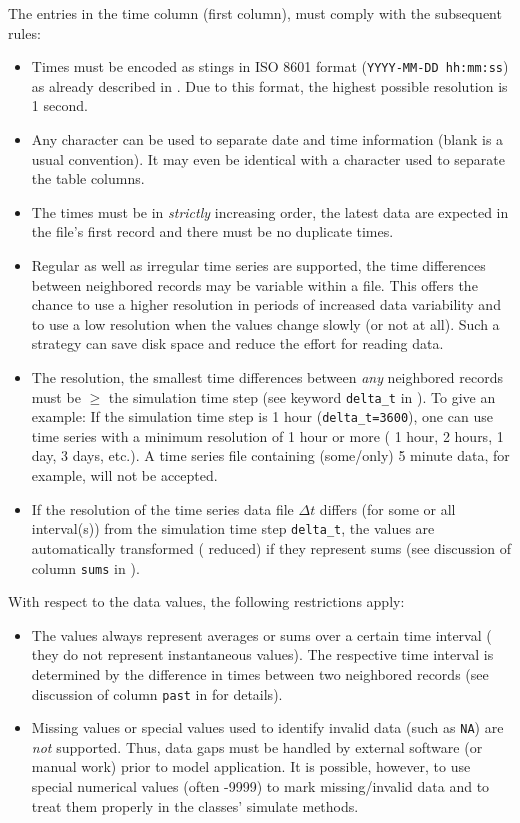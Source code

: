 The entries in the time column (first column), must comply with the subsequent rules:
\begin{itemize}
  \item Times must be encoded as stings in ISO 8601 format (\verb!YYYY-MM-DD hh:mm:ss!) as already described in . Due to this format, the highest possible resolution is 1 second.
  \item Any character can be used to separate date and time information (blank is a usual convention). It may even be identical with a character used to separate the table columns.
  \item The times must be in \emph{strictly} increasing order, \ie{} the latest data are expected in the file's first record and there must be no duplicate times.
  \item Regular as well as irregular time series are supported, \ie{} the time differences between neighbored records may be variable within a file. This offers the chance to use a higher resolution in periods of increased data variability and to use a low resolution when the values change slowly (or not at all). Such a strategy can save disk space and reduce the effort for reading data.
  \item The resolution, \ie{} the smallest time differences between \emph{any} neighbored records must be $\geq$ the simulation time step (see keyword \verb!delta_t! in ). To give an example: If the simulation time step is 1 hour (\verb!delta_t=3600!), one can use time series with a minimum resolution of 1 hour or more (\ie{} 1 hour, 2 hours, 1 day, 3 days, etc.). A time series file containing (some/only) 5 minute data, for example, will not be accepted.
  \item If the resolution of the time series data file $\Delta t$ differs (for some or all interval(s)) from the simulation time step \verb!delta_t!, the values are automatically transformed (\ie{} reduced) if they represent sums (see discussion of column \verb!sums! in ).
\end{itemize}

With respect to the data values, the following restrictions apply:
\begin{itemize}
  \item The values always represent averages or sums over a certain time interval (\ie{} they do not represent instantaneous values). The respective time interval is determined by the difference in times between two neighbored records (see discussion of column \verb!past! in  for details).
  \item Missing values or special values used to identify invalid data (such as \verb!NA!) are \emph{not} supported. Thus, data gaps must be handled by external software (or manual work) prior to model application. It is possible, however, to use special numerical values (often -9999) to mark missing/invalid data and to treat them properly in the classes' simulate methods.
\end{itemize}

